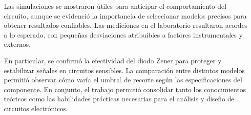 \documentclass[chaptersright]{informeutn}
\begin{document}
    Las simulaciones se mostraron útiles para anticipar el comportamiento del circuito, aunque se evidenció la importancia de seleccionar modelos precisos para obtener resultados confiables. Las mediciones en el laboratorio resultaron acordes a lo esperado, con pequeñas desviaciones atribuibles a factores instrumentales y externos.

    En particular, se confirmó la efectividad del diodo Zener para proteger y estabilizar señales en circuitos sensibles. La comparación entre distintos modelos permitió observar cómo varía el umbral de recorte según las especificaciones del componente. En conjunto, el trabajo permitió consolidar tanto los conocimientos teóricos como las habilidades prácticas necesarias para el análisis y diseño de circuitos electrónicos.
    
\end{document}
